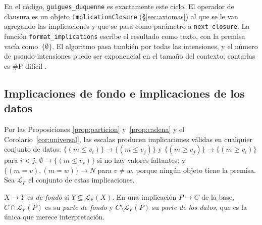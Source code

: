 En el código, \texttt{guigues\_duquenne} es exactamente este ciclo. El operador de clausura es un objeto \texttt{ImplicationClosure} (\S\ref{sec:axiomas}) al que se le van agregando las implicaciones y que se pasa como parámetro a \texttt{next\_closure}. La función \texttt{format\_implications} escribe el resultado como texto, con la premisa vacía como~$\{\emptyset\}$. El algoritmo pasa también por todas las intensiones, y el número de pseudo-intensiones puede ser exponencial en el tamaño del contexto; contarlas es \#P-difícil \parencite{kuznetsov2004intratable}.


\subsection{Implicaciones de fondo e implicaciones de los datos}
\label{sec:fondo}

Por las Proposiciones \ref{prop:particion} y~\ref{prop:cadena} y el Corolario~\ref{cor:universal}, las escalas producen implicaciones válidas en cualquier conjunto de datos: $\{(m{\le}v_i)\} \to \{(m{\le}v_j)\}$ y $\{(m{\ge}v_j)\} \to \{(m{\ge}v_i)\}$ para $i < j$; $\emptyset \to \{(m{\le}v_r)\}$ si no hay valores faltantes; y $\{(m{=}v), (m{=}w)\} \to N$ para $v \neq w$, porque ningún objeto tiene la premisa. Sea $\mathcal{L}_F$ el conjunto de estas implicaciones.

\begin{definicion}\label{def:fondo}
$X \to Y$ es \emph{de fondo} si $Y \subseteq \mathcal{L}_F(X)$. En una implicación $P \to C$ de la base, $C \cap \mathcal{L}_F(P)$ es su \emph{parte de fondo} y $C \setminus \mathcal{L}_F(P)$ su \emph{parte de los datos}, que es la única que merece interpretación.
\end{definicion}

